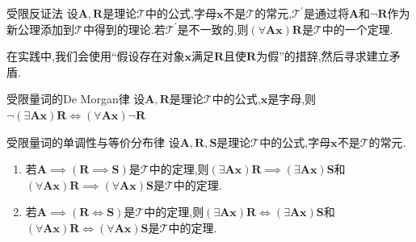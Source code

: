 \begin{metatheorem}{受限反证法}{}
	设$\boldsymbol{A},\boldsymbol{R}$是理论$\mathcal{T}$中的公式,字母$\boldsymbol{x}$不是$\mathcal{T}$的常元,$\mathcal{T}^{\prime}$是通过将$\boldsymbol{A}$和$\neg\boldsymbol{R}$作为新公理添加到$\mathcal{T}$中得到的理论.若$\mathcal{T}^{\prime}$是不一致的,则$\left(\forall\boldsymbol{A}\boldsymbol{x}\right)\boldsymbol{R}$是$\mathcal{T}$中的一个定理.
\end{metatheorem}

\begin{remark}{}{}
	在实践中,我们会使用``假设存在对象$\boldsymbol{x}$满足$\boldsymbol{R}$且使$\boldsymbol{R}$为假''的措辞,然后寻求建立矛盾.
\end{remark}

\begin{metatheorem}{受限量词的De Morgan律}{}
	设$\boldsymbol{A},\boldsymbol{R}$是理论$\mathcal{T}$中的公式,$\boldsymbol{x}$是字母,则$\neg\left(\exists\boldsymbol{A}\boldsymbol{x}\right)\boldsymbol{R}\iff\left(\forall\boldsymbol{A}\boldsymbol{x}\right)\neg\boldsymbol{R}$
\end{metatheorem}

\begin{metatheorem}{受限量词的单调性与等价分布律}{}
	设$\boldsymbol{A},\boldsymbol{R},\boldsymbol{S}$是理论$\mathcal{T}$中的公式,字母$\boldsymbol{x}$不是$\mathcal{T}$的常元.
	\begin{enumerate}
		\item 若$\boldsymbol{A}\implies\left(\boldsymbol{R}\implies\boldsymbol{S}\right)$是$\mathcal{T}$中的定理,则$\left(\exists\boldsymbol{A}\boldsymbol{x}\right)\boldsymbol{R}\implies\left(\exists\boldsymbol{A}\boldsymbol{x}\right)\boldsymbol{S}$和$\left(\forall\boldsymbol{A}\boldsymbol{x}\right)\boldsymbol{R}\implies\left(\forall\boldsymbol{A}\boldsymbol{x}\right)\boldsymbol{S}$是$\mathcal{T}$中的定理.
		\item 若$\boldsymbol{A}\implies\left(\boldsymbol{R}\iff\boldsymbol{S}\right)$是$\mathcal{T}$中的定理,则$\left(\exists\boldsymbol{A}\boldsymbol{x}\right)\boldsymbol{R}\iff\left(\exists\boldsymbol{A}\boldsymbol{x}\right)\boldsymbol{S}$和$\left(\forall\boldsymbol{A}\boldsymbol{x}\right)\boldsymbol{R}\iff\left(\forall\boldsymbol{A}\boldsymbol{x}\right)\boldsymbol{S}$是$\mathcal{T}$中的定理.
	\end{enumerate}
\end{metatheorem}


